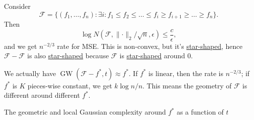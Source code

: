 \begin{eg}[Unimodal]
	Consider
	\[
		\mathscr{F} = \{ (f_1, \dots , f_n) \colon \exists i \colon f_1 \leq f_2 \leq \dots \leq f_i \geq f_{i+1} \geq \dots \geq f_n \}.
	\]
	Then
	\[
		\log N(\mathscr{F} , \lVert \cdot \rVert _2 / \sqrt{n} , \epsilon ) \leq \frac{c}{\epsilon },
	\]
	and we get \(n^{-2 / 3}\) rate for MSE. This is non-convex, but it's \hyperref[def:star-shaped]{star-shaped}, hence \(\mathscr{F} - \mathscr{F} \) is also \hyperref[def:star-shaped]{star-shaped} because \(\mathscr{F} \) is \hyperref[def:star-shaped]{star-shaped} around \(0\).
\end{eg}

\begin{remark}
	We actually have \(\mathop{\mathrm{GW}}(\mathscr{F} - f^{\ast} , t) \approx f^{\ast} \). If \(f^{\ast} \) is linear, then the rate is \(n^{-2 / 3}\); if \(f^{\ast} \) is \(K\) pieces-wise constant, we get \(k \log n / n\). This means the geometry of \(\mathscr{F} \) is different around different \(f^{\ast} \).
\end{remark}

The geometric and local Gaussian complexity around \(f^{\ast} \) as a function of \(t\)